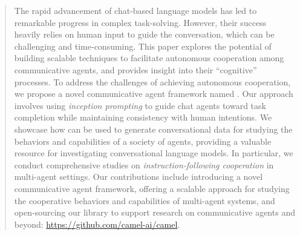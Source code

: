 \begin{abstract}
The rapid advancement of chat-based language models has led to remarkable progress in complex task-solving. However, their success heavily relies on human input to guide the conversation, which can be challenging and time-consuming. This paper explores the potential of building scalable techniques to facilitate autonomous cooperation among communicative agents, and provides insight into their ``cognitive'' processes. To address the challenges of achieving autonomous cooperation, we propose a novel communicative agent framework named \RP. Our approach involves using \textit{inception prompting} to guide chat agents toward task completion while maintaining consistency with human intentions. We showcase how \RP can be used to generate conversational data for studying the behaviors and capabilities of a society of agents, providing a valuable resource for investigating conversational language models.
In particular, we conduct comprehensive studies on \emph{instruction-following cooperation} in multi-agent settings.
Our contributions include introducing a novel communicative agent framework, offering a scalable approach for studying the cooperative behaviors and capabilities of multi-agent systems, and open-sourcing our library to support research on communicative agents and beyond: \url{https://github.com/camel-ai/camel}.

\end{abstract}
